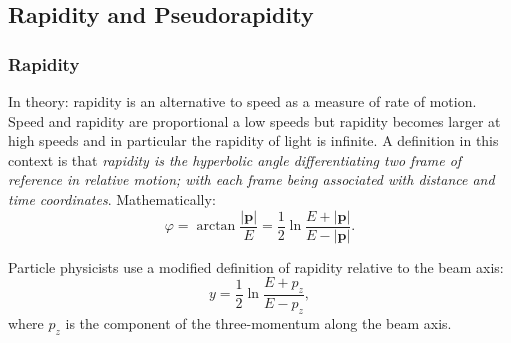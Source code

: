\documentclass{article}
\begin{document}
\subsection{Rapidity and Pseudorapidity}
\subsubsection{Rapidity}
In theory: rapidity is an alternative to speed as a measure of rate of motion. Speed and rapidity are proportional a low speeds but rapidity becomes larger at high speeds and in particular the rapidity of light is infinite. A definition in this context is that \emph{rapidity is the hyperbolic angle differentiating two frame of reference in relative motion; with each frame being associated with distance and time coordinates}. Mathematically: $$ \varphi = \arctan \frac{| \mathbf{p}|}{E} = \frac{1}{2} \ln \frac{E + | \mathbf{p}|}{E - | \mathbf{p}|}. $$

Particle physicists use a modified definition of rapidity relative to the beam axis:
\begin{equation}
\label{rapidity}
y =  \frac{1}{2} \ln \frac{E+p_{z}}{E-p_{z}},
\end{equation}
where $p_{z}$ is the component of the three-momentum along the beam axis.
\end{document}

